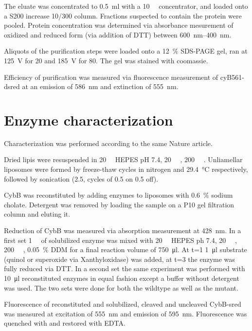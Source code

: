 The eluate was concentrated to \SI{0.5}{\ml} with a \SI{10}{\kilo\Da}
concentrator, and loaded onto a S200 increase 10/300 column. Fractions
suspected to contain the protein were pooled. Protein concentration was
determined via absorbance mesurement of oxidized and reduced form (via addition
of DTT) between \SIrange{600}{400}{\nm}.

Aliquots of the purification steps were loaded onto a \SI{12}{\percent}
SDS-PAGE gel, ran at \SI{125}{\V} for \SI{20}{\min} and \SI{185}{\V} for
\SI{80}{\min}. The gel was stained with coomassie.

Efficiency of purification was measured via fluorescence measurement of
cyB561-dsred at an emission of \SI{586}{\nm} and extinction of \SI{555}{\nm}.

\section{Enzyme characterization}

Characterization was performed according to the same Nature
article\cite{superoxide_salvaging}.

Dried lipis were resuspended in \SI{20}{\milli\Molar} HEPES pH 7.4,
\SI{20}{\milli\Molar} , \SI{200}{\milli\Molar} . Unliamellar
liposomes were formed by freeze-thaw cycles in nitrogen and \SI{29.4}{\celsius}
respectively, followed by sonication (\SI{2.5}{\min}, cycles of \SI{0.5}{\min}
on \SI{0.5}{\min} off).

CybB was reconstituted by adding enzymes to liposomes with \SI{0.6}{\percent}
sodium cholate. Detergent was removed by loading the sample on a P10 gel
filtration column and eluting it.

Reduction of CybB was measured via absorption measurement at \SI{428}{\nm}. In
a first set \SI{1}{\micro\Molar} of solubilized enzyme was mixed with
\SI{20}{\milli\Molar} HEPES ph 7.4, \SI{20}{\milli\Molar} ,
\SI{200}{\milli\Molar} , \SI{0.05}{\percent} DDM for a final reaction
volume of \SI{750}{\ul}. At t=\SI{1}{\min} \SI{1}{\ul} substrate (quinol or
superoxide via Xanthyloxidase) was added, at t=\SI{3}{\min} the enzyme was
fully reduced via DTT. In a second set the same experiment was performed with
\SI{10}{\ul} reconstituted enzymes in equal fashion except a buffer without
detergent was used. The two sets were done for both the wildtype as well as the
mutant.

Fluorescence of reconstituted and solubilized, cleaved and uncleaved CybB-sred
was measured at excitation of \SI{555}{\nm} and emission of \SI{595}{\nm}.
Fluorescence was quenched with  and restored with EDTA.

